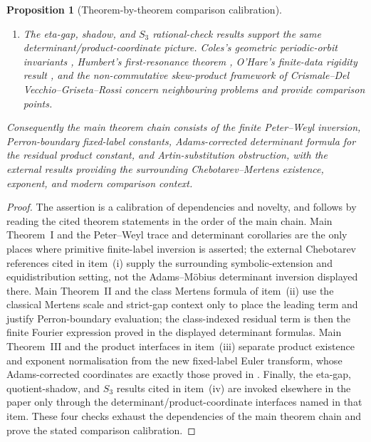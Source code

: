 \documentclass[11pt,a4paper]{amsart}
\theoremstyle{plain}
\newtheorem{proposition}[theorem]{Proposition}
\theoremstyle{definition}
\theoremstyle{remark}
\begin{document}
\begin{proposition}[Theorem-by-theorem comparison calibration]
\begin{enumerate}[label=\textup{(\roman*)},leftmargin=*]
    ordinary periodic Artin logarithm
    \(\mathcal L_\varrho(\lambda^{-1})\) for
    \(F_\varrho(\lambda^{-1})\).
    \item The eta-gap, shadow, and \(S_3\) rational-check results support the
    same determinant/product-coordinate picture.  Coles's geometric
    periodic-orbit invariants \cite{Coles2025VassilievWritheAxiomA}, Humbert's
    first-resonance theorem \cite{Humbert2025FirstRuelleResonance}, O'Hare's
    finite-data rigidity result \cite{OHare2025FiniteDataRigidity}, and the
    non-commutative skew-product framework of Crismale--Del Vecchio--Griseta--Rossi
    \cite{CrismaleDelVecchioGrisetaRossi2025NoncommutativeSkewProduct} concern
    neighbouring problems and provide comparison points.
  \end{enumerate}
  Consequently the main theorem chain consists of the finite Peter--Weyl
  inversion, Perron-boundary fixed-label constants, Adams-corrected determinant
  formula for the residual product constant, and Artin-substitution obstruction,
  with the external results providing the surrounding Chebotarev--Mertens
  existence, exponent, and modern comparison context.
\end{proposition}

\begin{proof}
  The assertion is a calibration of dependencies and novelty, and follows by
  reading the cited theorem statements in the order of the main chain.  Main
  Theorem~I and the Peter--Weyl trace and determinant corollaries are the only
  places where primitive finite-label inversion is asserted; the external
  Chebotarev references cited in item~\textup{(i)} supply the surrounding
  symbolic-extension and equidistribution setting, not the Adams--M\"obius
  determinant inversion displayed there.  Main Theorem~II and the class Mertens
  formula of item~\textup{(ii)} use the classical Mertens scale and strict-gap
  context only to place the leading term and justify Perron-boundary evaluation;
  the class-indexed residual term is then the finite Fourier expression proved
  in the displayed determinant formulas.  Main Theorem~III and the product
  interfaces in item~\textup{(iii)} separate product existence and exponent
  normalisation from the new fixed-label Euler transform, whose Adams-corrected
  coordinates are exactly those proved in
  .
  Finally, the eta-gap, quotient-shadow, and \(S_3\) results cited in
  item~\textup{(iv)} are invoked elsewhere in the paper only through the
  determinant/product-coordinate interfaces named in that item.  These four
  checks exhaust the dependencies of the main theorem chain and prove the
  stated comparison calibration.
\end{proof}
\end{document}
